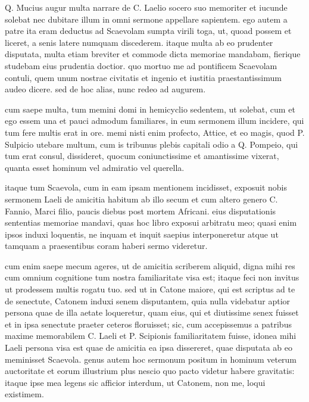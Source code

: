 
 Q. Mucius augur multa narrare de C. Laelio socero suo memoriter et iucunde solebat nec dubitare illum in omni sermone appellare sapientem. ego autem a patre ita eram deductus ad Scaevolam sumpta virili toga, ut, quoad possem et liceret, a senis latere numquam discederem. itaque multa ab eo prudenter disputata, multa etiam breviter et commode dicta memoriae mandabam, fierique studebam eius prudentia doctior. quo mortuo me ad pontificem Scaevolam contuli, quem unum nostrae civitatis et ingenio et iustitia praestantissimum audeo dicere. sed de hoc alias, nunc redeo ad augurem.

 cum saepe multa, tum memini domi in hemicyclio sedentem, ut solebat, cum et ego essem una et pauci admodum familiares, in eum sermonem illum incidere, qui tum fere multis erat in ore. memi nisti enim profecto, Attice, et eo magis, quod P. Sulpicio utebare multum, cum is tribunus plebis capitali odio a Q. Pompeio, qui tum erat consul, dissideret, quocum coniunctissime et amantissime vixerat, quanta esset hominum vel admiratio vel querella.

 itaque tum Scaevola, cum in eam ipsam mentionem incidisset, exposuit nobis sermonem Laeli de amicitia habitum ab illo secum et cum altero genero C. Fannio, Marci filio, paucis diebus post mortem Africani. eius disputationis sententias memoriae mandavi, quas hoc libro exposui arbitratu meo; quasi enim ipsos induxi loquentis, ne inquam et inquit saepius interponeretur atque ut tamquam a praesentibus coram haberi sermo videretur.

 cum enim saepe mecum ageres, ut de amicitia scriberem aliquid, digna mihi res cum omnium cognitione tum nostra familiaritate visa est; itaque feci non invitus ut prodessem multis rogatu tuo. sed ut in Catone maiore, qui est scriptus ad te de senectute, Catonem induxi senem disputantem, quia nulla videbatur aptior persona quae de illa aetate loqueretur, quam eius, qui et diutissime senex fuisset et in ipsa senectute praeter ceteros floruisset; sic, cum accepissemus a patribus maxime memorabilem C. Laeli et P. Scipionis familiaritatem fuisse, idonea mihi Laeli persona visa est quae de amicitia ea ipsa dissereret, quae disputata ab eo meminisset Scaevola. genus autem hoc sermonum positum in hominum veterum auctoritate et eorum illustrium plus nescio quo pacto videtur habere gravitatis: itaque ipse mea legens sic afficior interdum, ut Catonem, non me, loqui existimem.

